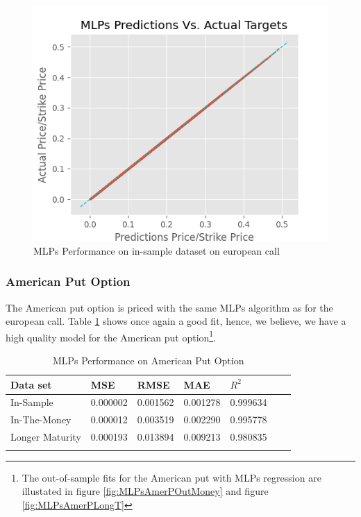 \begin{figure}[th]
\centering
\includegraphics{Figures/PredictionEuroC.png}
\decoRule
\caption[MLPs Performance on in-sample dataset European Call]{MLPs Performance on in-sample dataset on european call}
\label{fig:MLPsInSampleEuroC}
\end{figure}


\subsubsection{American Put Option}
The American put option is priced with the same MLPs algorithm as for the european call. Table \ref{tab:AmerPerformanceComparision} shows once again a good fit, hence, we believe, we have a high quality model for the American put option\footnote{The out-of-sample fits for the American put with MLPs regression are illustated in figure \ref{fig:MLPsAmerPOutMoney} and figure \ref{fig:MLPsAmerPLongT}}.

\begin{table}[th]
\caption{MLPs Performance on American Put Option}
\label{tab:AmerPerformanceComparision}
\centering
\begin{tabular}{l l l l l l l }
\toprule
\textbf{Data set} & \textbf{MSE} & \textbf{RMSE} & \textbf{MAE} & \textbf{$R^2$} \\
\midrule
In-Sample & 0.000002 & 0.001562 & 0.001278 & 0.999634\\
In-The-Money & 0.000012 & 0.003519 & 0.002290 & 0.995778\\
Longer Maturity & 0.000193 & 0.013894 & 0.009213 & 0.980835\\
\bottomrule\\
\end{tabular}
\end{table}


